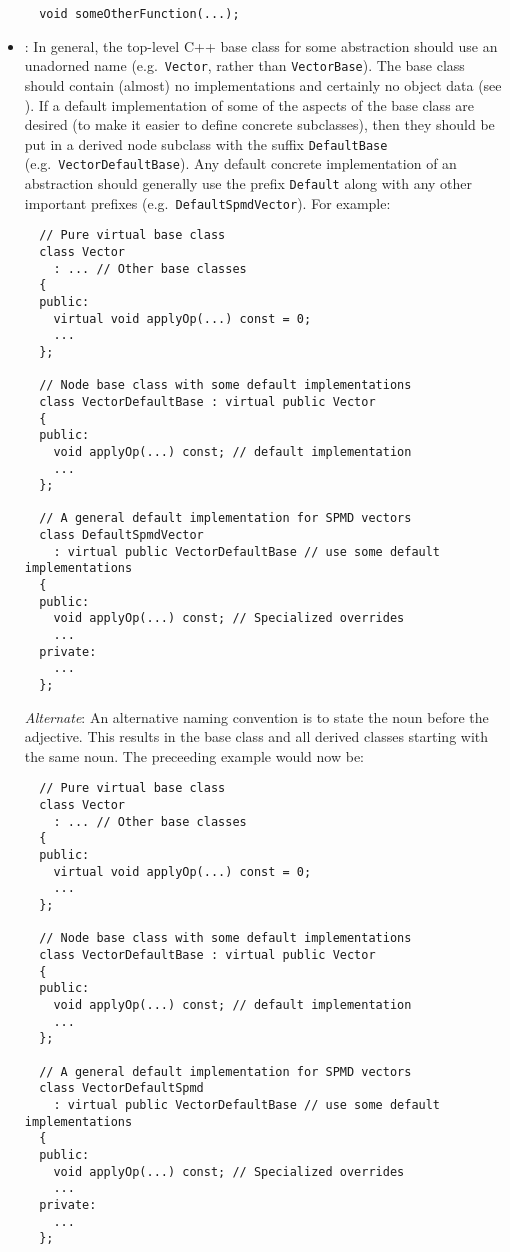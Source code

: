 \begin{itemize}
{\begin{verbatim}
  void someOtherFunction(...);
\end{verbatim}}


\item\NCBaseDefaultClassNames: In general, the top-level C++ base
  class for some abstraction should use an unadorned name (e.g.\
  \texttt{Vector}, rather than \texttt{VectorBase}).  The base class
  should contain (almost) no implementations and certainly no object
  data (see \cite[Item 36]{C++CodingStandards05}).  If a default
  implementation of some of the aspects of the base class are desired
  (to make it easier to define concrete subclasses), then they should
  be put in a derived node subclass with the suffix
  \texttt{DefaultBase} (e.g.\ \texttt{Vector\-Default\-Base}).  Any
  default concrete implementation of an abstraction should generally
  use the prefix \texttt{Default} along with any other important
  prefixes (e.g.\ \texttt{DefaultSpmdVector}).  For example:

{\small\begin{verbatim}
  // Pure virtual base class 
  class Vector
    : ... // Other base classes
  {
  public:
    virtual void applyOp(...) const = 0;
    ...
  };

  // Node base class with some default implementations
  class VectorDefaultBase : virtual public Vector
  {
  public:
    void applyOp(...) const; // default implementation
    ...
  };

  // A general default implementation for SPMD vectors
  class DefaultSpmdVector
    : virtual public VectorDefaultBase // use some default implementations
  {
  public:
    void applyOp(...) const; // Specialized overrides
    ...
  private:
    ...
  };
\end{verbatim}}

  \textit{Alternate}: An alternative naming convention is to state the
  noun before the adjective.  This results in the base class and all derived classes starting with the same noun.  The preceeding example would now be:

{\small\begin{verbatim}
  // Pure virtual base class 
  class Vector
    : ... // Other base classes
  {
  public:
    virtual void applyOp(...) const = 0;
    ...
  };

  // Node base class with some default implementations
  class VectorDefaultBase : virtual public Vector
  {
  public:
    void applyOp(...) const; // default implementation
    ...
  };

  // A general default implementation for SPMD vectors
  class VectorDefaultSpmd
    : virtual public VectorDefaultBase // use some default implementations
  {
  public:
    void applyOp(...) const; // Specialized overrides
    ...
  private:
    ...
  };
\end{verbatim}}


\end{itemize}
